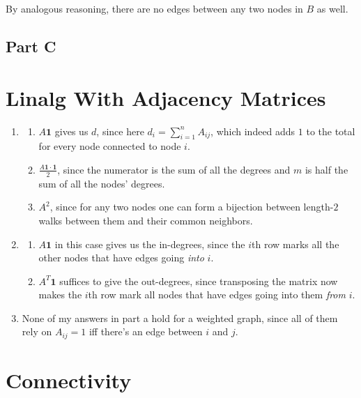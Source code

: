 \documentclass[12pt]{article}
\begin{document}
By analogous reasoning, there are no edges between any two nodes in $B$ as well.

\subsection{Part C}

\section{Linalg With Adjacency Matrices}

\begin{enumerate}
      \item \begin{enumerate}[label=\roman*.]
                  \item $\boxed{A\mathbf{1}}$ gives us $d$, since here $d_i=\sum_{i=1}^{n} A_{ij}$,
                        which indeed adds $1$ to the total for every node connected to node $i$.
                  \item $\boxed{\frac{A\mathbf{1} \cdot \mathbf{1}}{2}}$, since the numerator
                        is the sum of all the degrees and $m$ is half the sum of all the nodes' degrees.
                  \item $\boxed{A^2}$, since for any two nodes one can form a bijection between
                        length-$2$ walks between them and their common neighbors.
            \end{enumerate}
      \item \begin{enumerate}[label=\roman*.]
                  \item $\boxed{A\mathbf{1}}$ in this case gives us the in-degrees,
                        since the $i$th row marks all the other nodes that have edges going \textit{into} $i$.
                  \item $\boxed{A^T\mathbf{1}}$ suffices to give the out-degrees,
                        since transposing the matrix now makes the $i$th row mark all nodes
                        that have edges going into them \textit{from} $i$.
            \end{enumerate}
      \item None of my answers in part a hold for a weighted graph, since all of them rely
            on $A_{ij}=1$ iff there's an edge between $i$ and $j$.
\end{enumerate}

\section{Connectivity}
\end{document}
